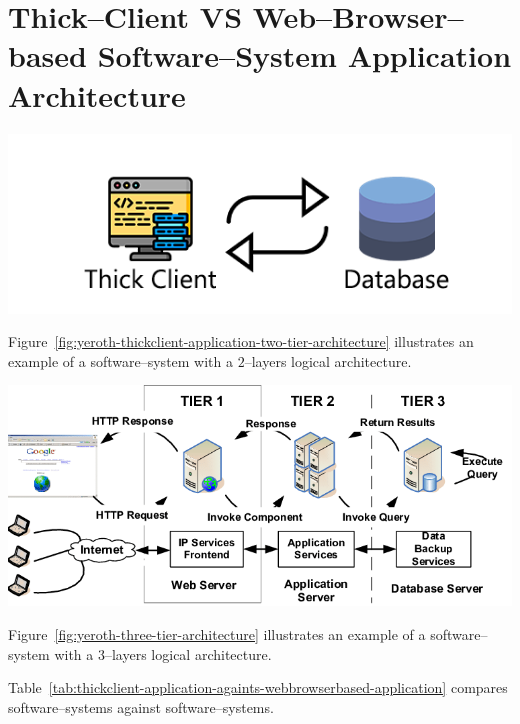 \chapter{Thick--Client VS Web--Browser--based
	Software--System Application Architecture}



\begin{center}
\includegraphics[scale=0.52]{images/yeroth-thickclient-application-two-tier-architecture.png}
\label{fig:yeroth-thickclient-application-two-tier-architecture}
\end{center}

Figure~\ref{fig:yeroth-thickclient-application-two-tier-architecture}
illustrates an example of a \thickclient
software--system with a $2$--layers
logical architecture.

\begin{center}
\includegraphics[scale=0.39]{images/yeroth-three-tier-architecture.png}
\label{fig:yeroth-three-tier-architecture}
\end{center}

Figure~\ref{fig:yeroth-three-tier-architecture}
illustrates an example of a \webbrowserbased
software--system with a $3$--layers
logical architecture.

Table~\ref{tab:thickclient-application-againts-webbrowserbased-application}
compares \thickclient software--systems against
\webbrowserbased software--systems.